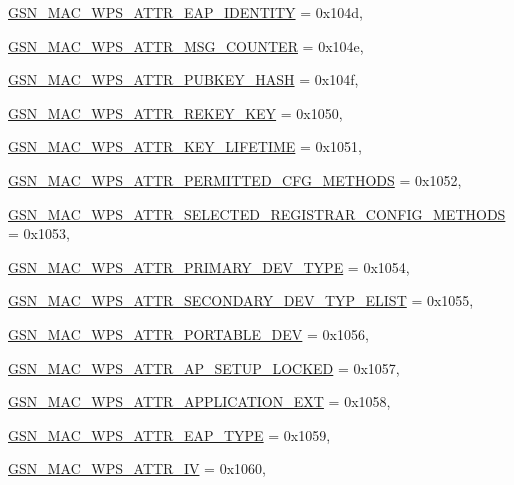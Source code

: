 \begin{DoxyCompactItemize}
\par
\hyperlink{a00642_gga0ae19d69a0b381d883890df8a7812414ac26c41281a3d8a08bf5aa9cafd12e1e0}{GSN\_\-MAC\_\-WPS\_\-ATTR\_\-EAP\_\-IDENTITY} =  0x104d, 
\par
\hyperlink{a00642_gga0ae19d69a0b381d883890df8a7812414a6eca670b85550427017fe20b3769627a}{GSN\_\-MAC\_\-WPS\_\-ATTR\_\-MSG\_\-COUNTER} =  0x104e, 
\par
\hyperlink{a00642_gga0ae19d69a0b381d883890df8a7812414ab9823407c5f09c370cec3ebc15eaf768}{GSN\_\-MAC\_\-WPS\_\-ATTR\_\-PUBKEY\_\-HASH} =  0x104f, 
\par
\hyperlink{a00642_gga0ae19d69a0b381d883890df8a7812414a2f9230427597a54f33ebdb495ce4e875}{GSN\_\-MAC\_\-WPS\_\-ATTR\_\-REKEY\_\-KEY} =  0x1050, 
\par
\hyperlink{a00642_gga0ae19d69a0b381d883890df8a7812414a7c493d54cbe9bcdbf614d0ef1eb8c698}{GSN\_\-MAC\_\-WPS\_\-ATTR\_\-KEY\_\-LIFETIME} =  0x1051, 
\par
\hyperlink{a00642_gga0ae19d69a0b381d883890df8a7812414ad5533224919266772b2e66b15e249329}{GSN\_\-MAC\_\-WPS\_\-ATTR\_\-PERMITTED\_\-CFG\_\-METHODS} =  0x1052, 
\par
\hyperlink{a00642_gga0ae19d69a0b381d883890df8a7812414ab8085b8e758237446f2dea40d1163170}{GSN\_\-MAC\_\-WPS\_\-ATTR\_\-SELECTED\_\-REGISTRAR\_\-CONFIG\_\-METHODS} =  0x1053, 
\par
\hyperlink{a00642_gga0ae19d69a0b381d883890df8a7812414a8e09e6a61a2a303b81ee1a97ee2bdc56}{GSN\_\-MAC\_\-WPS\_\-ATTR\_\-PRIMARY\_\-DEV\_\-TYPE} =  0x1054, 
\par
\hyperlink{a00642_gga0ae19d69a0b381d883890df8a7812414aeef9d9adce9ef3a96e43ef49162e6b7e}{GSN\_\-MAC\_\-WPS\_\-ATTR\_\-SECONDARY\_\-DEV\_\-TYP\_\-ELIST} =  0x1055, 
\par
\hyperlink{a00642_gga0ae19d69a0b381d883890df8a7812414a026fdeb1d92c07881b4647872a7e4b4b}{GSN\_\-MAC\_\-WPS\_\-ATTR\_\-PORTABLE\_\-DEV} =  0x1056, 
\par
\hyperlink{a00642_gga0ae19d69a0b381d883890df8a7812414a4a5a1ab8cec5bb899989e7753a806d11}{GSN\_\-MAC\_\-WPS\_\-ATTR\_\-AP\_\-SETUP\_\-LOCKED} =  0x1057, 
\par
\hyperlink{a00642_gga0ae19d69a0b381d883890df8a7812414a229f8589f7ca2eea8cad9c8f1a45f53c}{GSN\_\-MAC\_\-WPS\_\-ATTR\_\-APPLICATION\_\-EXT} =  0x1058, 
\par
\hyperlink{a00642_gga0ae19d69a0b381d883890df8a7812414a377bf260f557239e4b247b0a00f844fc}{GSN\_\-MAC\_\-WPS\_\-ATTR\_\-EAP\_\-TYPE} =  0x1059, 
\par
\hyperlink{a00642_gga0ae19d69a0b381d883890df8a7812414a7124169a361bbebc153ff846efdaba5e}{GSN\_\-MAC\_\-WPS\_\-ATTR\_\-IV} =  0x1060, 

\end{DoxyCompactItemize}
